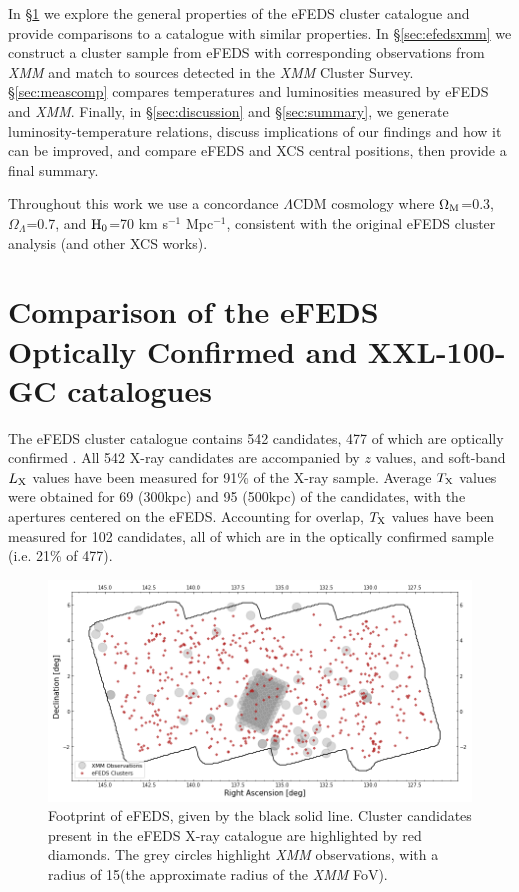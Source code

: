 \documentclass[fleqn,usenatbib]{mnras}
\begin{document}
In \S\ref{sec:efedsproperties} we explore the general properties of the eFEDS cluster catalogue and provide comparisons to a catalogue with similar properties. In \S\ref{sec:efedsxmm} we construct a cluster sample from eFEDS with corresponding observations from {\em XMM} and match to sources detected in the {\em XMM} Cluster Survey. \S\ref{sec:meascomp} compares temperatures and luminosities measured by eFEDS and {\em XMM}. Finally, in \S\ref{sec:discussion} and \S\ref{sec:summary}, we generate luminosity-temperature relations, discuss implications of our findings and how it can be improved, and compare eFEDS and XCS central positions, then provide a final summary.

Throughout this work we use a concordance $\Lambda$CDM cosmology where $\Omega_{\rm{M}}$=0.3, $\Omega_{\Lambda}$=0.7, and $\rm{H}_{0}$=70 km s$^{-1}$ Mpc$^{-1}$, consistent with the original eFEDS cluster analysis (and other XCS works).

\section{Comparison of the \lowercase{e}FEDS Optically Confirmed and XXL-100-GC catalogues}
\label{sec:efedsproperties}

The eFEDS cluster catalogue \citep{efedsclustercat} contains 542 candidates, 477 of which are optically confirmed \citep{efedsclusteropticalcat}. All 542 X-ray candidates are accompanied by $z$ values, and soft-band $L_{\rm X}$ values have been measured for 91\% of the X-ray sample. Average $T_{\rm X}$ values were obtained for 69 (300kpc) and 95 (500kpc) of the candidates, with the apertures centered on the eFEDS. Accounting for overlap, $T_{\rm X}$ values have been measured for 102 candidates, all of which are in the optically confirmed sample (i.e. 21\% of 477).

\begin{figure}
    \centering
    \includegraphics[width=1.0\textwidth]{images/outline_withborder.png}
    \caption[]{Footprint of eFEDS, given by the black solid line. Cluster candidates present in the eFEDS X-ray catalogue are highlighted by red diamonds. The grey circles highlight {\em XMM} observations, with a radius of 15\arcmin (the approximate radius of the {\em XMM} FoV).}
    \label{fig:efedsxcsclusters}
\end{figure}
\end{document}

